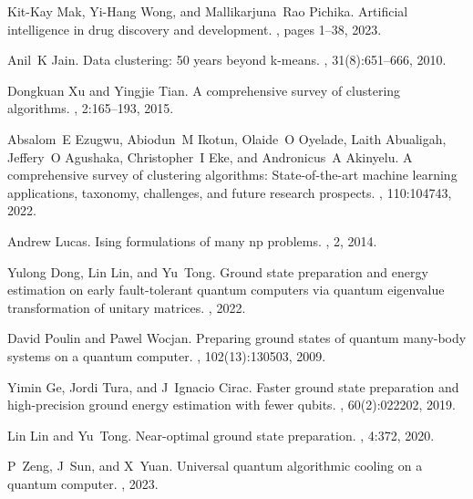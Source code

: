 \documentclass[showpacs,twocolumn,superscriptaddress]{revtex4-2}
\begin{document}
\begin{thebibliography}{10}
Kit-Kay Mak, Yi-Hang Wong, and Mallikarjuna~Rao Pichika.
\newblock Artificial intelligence in drug discovery and development.
, pages 1--38, 2023.

Anil~K Jain.
\newblock Data clustering: 50 years beyond k-means.
, 31(8):651--666, 2010.

Dongkuan Xu and Yingjie Tian.
\newblock A comprehensive survey of clustering algorithms.
, 2:165--193, 2015.

Absalom~E Ezugwu, Abiodun~M Ikotun, Olaide~O Oyelade, Laith Abualigah,
  Jeffery~O Agushaka, Christopher~I Eke, and Andronicus~A Akinyelu.
\newblock A comprehensive survey of clustering algorithms: State-of-the-art
  machine learning applications, taxonomy, challenges, and future research
  prospects.
,
  110:104743, 2022.

Andrew Lucas.
\newblock Ising formulations of many np problems.
, 2, 2014.

Yulong Dong, Lin Lin, and Yu~Tong.
\newblock Ground state preparation and energy estimation on early
  fault-tolerant quantum computers via quantum eigenvalue transformation of
  unitary matrices.
, 2022.

David Poulin and Pawel Wocjan.
\newblock Preparing ground states of quantum many-body systems on a quantum
  computer.
, 102(13):130503, 2009.

Yimin Ge, Jordi Tura, and J~Ignacio Cirac.
\newblock Faster ground state preparation and high-precision ground energy
  estimation with fewer qubits.
, 60(2):022202, 2019.

Lin Lin and Yu~Tong.
\newblock Near-optimal ground state preparation.
, 4:372, 2020.

P~Zeng, J~Sun, and X~Yuan.
\newblock Universal quantum algorithmic cooling on a quantum computer.
, 2023.


\end{thebibliography}
\end{document}
